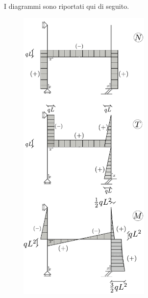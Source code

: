 I diagrammi sono riportati qui di seguito. 
\renewcommand{\thefigure}{12.2~-~7}
\begin{figure}[ht]
\centering
\includegraphics[width=0.58\textwidth]{Immagini/Parte_12/Esercizio12_2/12_2_7.pdf}
\caption{}
\label{Esercizio12-2-7}
\end{figure}

